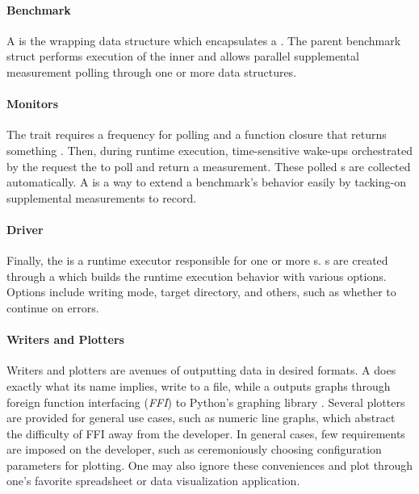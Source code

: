 \paragraph{Benchmark}
A  is the wrapping data structure which encapsulates a . The parent benchmark struct performs execution of the inner  and allows parallel supplemental measurement polling through one or more  data structures.

\paragraph{Monitors}
The  trait requires a frequency for polling and a function closure that returns something . Then, during runtime execution, time-sensitive wake-ups orchestrated by the  request the  to poll and return a measurement. These polled s are collected automatically. A  is a way to extend a benchmark's behavior easily by tacking-on supplemental measurements to record.

\paragraph{Driver}
Finally, the  is a runtime executor responsible for one or more s. s are created through a  which builds the runtime execution behavior with various options. Options include writing mode, target directory, and others, such as whether to continue on errors.

\paragraph{Writers and Plotters}
Writers and plotters are avenues of outputting data in desired formats. A  does exactly what its name implies, write  to a file, while a  outputs graphs through foreign function interfacing (\textit{FFI}) to Python's graphing library  . Several plotters are provided for general use cases, such as numeric line graphs, which abstract the difficulty of FFI away from the developer. In general cases, few requirements are imposed on the developer, such as ceremoniously choosing configuration parameters for plotting. One may also ignore these conveniences and plot through one's favorite spreadsheet or data visualization application.

